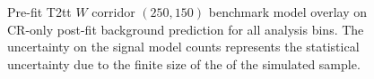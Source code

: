 \begin{figure}[!h]
{        \label{fig:T2tt_Wcorridor_MR_4j}
    } \\
     ~~
     \\
    \caption{
        Pre-fit T2tt $W$ corridor $(250,150)$ benchmark model overlay on
        CR-only post-fit background prediction for all analysis bins. The
        uncertainty on the signal model counts represents the statistical
        uncertainty due to the finite size of the of the simulated sample.
    }
    \label{fig:T2tt_Wcorridor_MR}
\end{figure}

